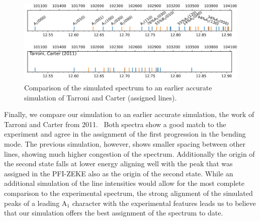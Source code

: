 \documentclass[12pt,prb,aps]{revtex4-2}
\begin{document}
\begin{figure}
    \includegraphics[width=16 cm]{figures/sim_vs_TarroniCarter}
    \caption{
        Comparison of the simulated spectrum to an earlier accurate simulation
        of Tarroni and Carter (assigned lines).~\cite{tarroni:O3:2011}
    }
    \label{fig:sim_vs_tarronicarter}
\end{figure}

Finally, we compare our simulation to an earlier accurate simulation, the work
of Tarroni and Carter from 2011.~\cite{tarroni:O3:2011} Both spectra show a
good match to the experiment and agree in the assignment of the first
progression in the bending mode. The previous simulation, however, shows
smaller spacing between other lines, showing much higher congestion of the
spectrum. Additionally the origin of the second state falls at lower energy
aligning well with the peak that was assigned in the PFI-ZEKE also as the
origin of the second state.  While an additional simulation of the line
intensities would allow for the most complete comparison to the experimental
spectrum, the strong alignment of the simulated peaks of a leading
A$_1$ character with the experimental features leads us to believe that our
simulation offers the best assignment of the spectrum to date.
\end{document}
